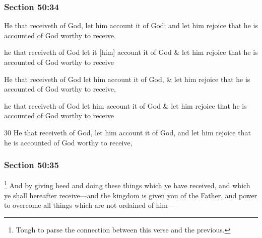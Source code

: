 	\subsubsection{Section 50:34} %
		\label{DC50-34}

		He that receiveth of God, let him account it of God; and let him rejoice that he is accounted of God worthy to receive.

		\begin{framed}
		\scriptsize
			\begin{compactdesc}
				\item[JSP] he that receiveth of God let it [him] account it of God \& let him rejoice that he is accounted of God worthy to receive
				\item[Gilbert] He that receiveth of God let him account it of God, \& let him rejoice that he is accounted of God worthy to receive,
				\item[Hyde and Smith] he that receiveth of God let him account it of God \& let him rejoice that he is accounted of God worthy to receive
				\item[BC] 30 He that receiveth of God, let him account it of God, and let him rejoice that he is accounted of God worthy to receive,
			\end{compactdesc}
		\end{framed}

	\subsubsection{Section 50:35} %
		\label{DC50-35}
		
			\footnote{%
				Tough to parse the connection between this verse and the previous.
				}%
		And by giving heed and doing these things which ye have received, and which ye shall hereafter receive---and the kingdom is given you of the Father, and power to overcome all things which are not ordained of him---

